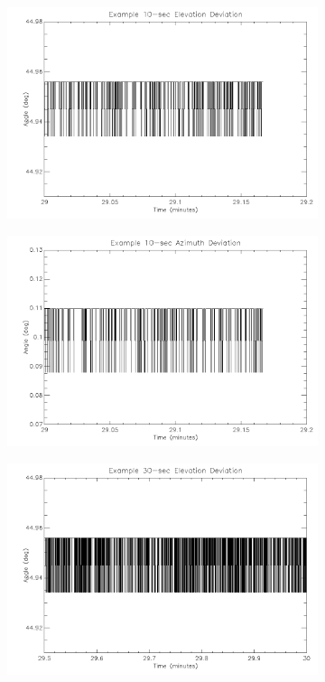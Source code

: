 \begin{figure}[htbp]
\begin{subfigure}{0.45\textwidth}
		\includegraphics[width=1\linewidth]{appendix/img/campaign_results/earlyalt10.png}
		\caption{}
		\label{fig:sub:earlyalt10}
	\end{subfigure}
	\begin{subfigure}{0.45\textwidth}
		\includegraphics[width=1\linewidth]{appendix/img/campaign_results/earlyaz10sec.png}
		\caption{}
		\label{fig:sub:earlyaz10}
	\end{subfigure}
	\begin{subfigure}{0.45\textwidth}
		\includegraphics[width=1\linewidth]{appendix/img/campaign_results/earlyalt30.png}

\end{subfigure}
\end{figure}
